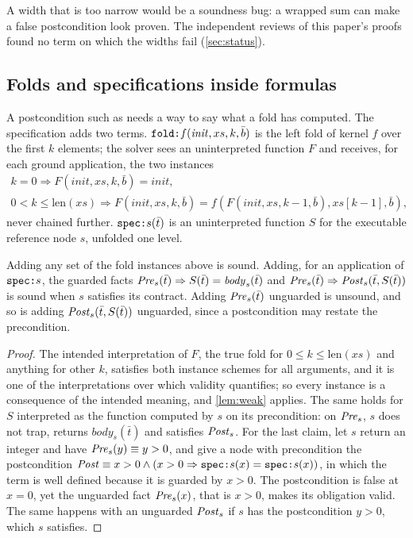 A width that is too narrow would be a soundness bug: a wrapped sum can make a false
postcondition look proven. The independent reviews of this paper's proofs found no term on which
the widths fail (\cref{sec:status}).

\subsection{Folds and specifications inside formulas}

A postcondition such as  needs a way to say what a fold has
computed. The specification adds two terms. $\texttt{fold:}f(\mathit{init},xs,k,\bar b)$ is the
left fold of kernel $f$ over the first $k$ elements; the solver sees an uninterpreted function
$F$ and receives, for each ground application, the two instances
\begin{gather*}
k=0\Rightarrow F(\mathit{init},xs,k,\bar b)=\mathit{init},\\
0<k\le\mathrm{len}(xs)\Rightarrow F(\mathit{init},xs,k,\bar b)=
f(F(\mathit{init},xs,k-1,\bar b),xs[k-1],\bar b),
\end{gather*}
never chained further. $\texttt{spec:}s(\bar t)$ is an uninterpreted function $S$ for the executable
reference node $s$, unfolded one level.

\begin{proposition}\label{prop:foldspec}
Adding any set of the fold instances above is sound. Adding, for an application of
$\texttt{spec:}s$, the guarded facts
$\mathit{Pre}_s(\bar t)\Rightarrow S(\bar t)=\mathit{body}_s(\bar t)$ and
$\mathit{Pre}_s(\bar t)\Rightarrow\mathit{Post}_s(\bar t,S(\bar t))$ is sound when $s$ satisfies its contract.
Adding $\mathit{Pre}_s(\bar t)$ unguarded is unsound, and so is adding $\mathit{Post}_s(\bar t,S(\bar t))$
unguarded, since a postcondition may restate the precondition.
\end{proposition}
\begin{proof}
The intended interpretation of $F$, the true fold for $0\le k\le\mathrm{len}(xs)$ and anything
for other $k$,
satisfies both instance schemes for all arguments, and it is one of the interpretations over
which validity quantifies; so every instance is a consequence of the intended meaning, and
\cref{lem:weak} applies. The same holds for $S$ interpreted as the function computed by $s$ on
its precondition: on $\mathit{Pre}_s$, $s$ does not trap, returns $\mathit{body}_s(\bar t)$ and
satisfies $\mathit{Post}_s$. For the last claim, let $s$ return an integer and have
$\mathit{Pre}_s(y)\equiv y>0$, and give a node with precondition  the postcondition
$\mathit{Post}\equiv x>0\wedge(x>0\Rightarrow\texttt{spec:}s(x)=\texttt{spec:}s(x))$, in which the
 term is well defined because it is guarded by $x>0$. The postcondition is false at
$x=0$, yet the unguarded fact $\mathit{Pre}_s(x)$, that is $x>0$, makes its obligation valid. The same
happens with an unguarded $\mathit{Post}_s$ if $s$ has the postcondition $y>0$, which $s$ satisfies.
\end{proof}

